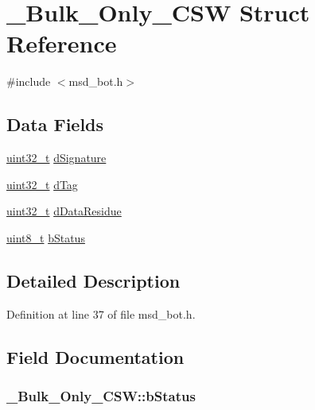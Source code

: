 \hypertarget{struct___bulk___only___c_s_w}{\section{\-\_\-\-Bulk\-\_\-\-Only\-\_\-\-C\-S\-W Struct Reference}
\label{struct___bulk___only___c_s_w}
}


{\ttfamily \#include $<$msd\-\_\-bot.\-h$>$}

\subsection*{Data Fields}
\begin{DoxyCompactItemize}
\item 
\hyperlink{stdint_8h_a435d1572bf3f880d55459d9805097f62}{uint32\-\_\-t} \hyperlink{struct___bulk___only___c_s_w_ae5a4c098a34cbfa8aab181f00d04f191}{d\-Signature}
\item 
\hyperlink{stdint_8h_a435d1572bf3f880d55459d9805097f62}{uint32\-\_\-t} \hyperlink{struct___bulk___only___c_s_w_ac33f4e90d62a86779945bf14ae015377}{d\-Tag}
\item 
\hyperlink{stdint_8h_a435d1572bf3f880d55459d9805097f62}{uint32\-\_\-t} \hyperlink{struct___bulk___only___c_s_w_a6ac97333841e8e4b90e2e4b6eaf86aa3}{d\-Data\-Residue}
\item 
\hyperlink{stdint_8h_aba7bc1797add20fe3efdf37ced1182c5}{uint8\-\_\-t} \hyperlink{struct___bulk___only___c_s_w_a6994f67ea87138705fbdea5c2f7cbb37}{b\-Status}
\end{DoxyCompactItemize}


\subsection{Detailed Description}


Definition at line 37 of file msd\-\_\-bot.\-h.



\subsection{Field Documentation}
\hypertarget{struct___bulk___only___c_s_w_a6994f67ea87138705fbdea5c2f7cbb37}{
\subsubsection[{b\-Status}]{ \-\_\-\-Bulk\-\_\-\-Only\-\_\-\-C\-S\-W\-::b\-Status}}\label{struct___bulk___only___c_s_w_a6994f67ea87138705fbdea5c2f7cbb37}


